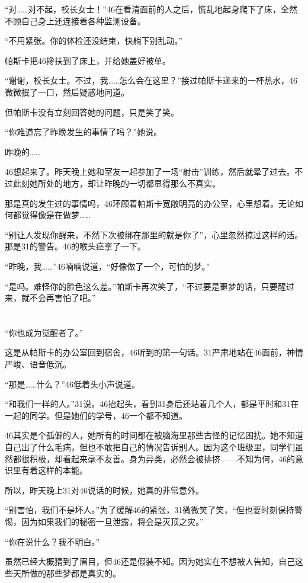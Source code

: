 “对……对不起，校长女士！”46在看清面前的人之后，慌乱地起身爬下了床，全然不顾自己身上还连接着各种监测设备。

“不用紧张。你的体检还没结束，快躺下别乱动。”

帕斯卡把46搀扶到了床上，并给她盖好被单。

“谢谢，校长女士。不过，我……怎么会在这里？”接过帕斯卡递来的一杯热水，46微微抿了一口，然后疑惑地问道。

但帕斯卡没有立刻回答她的问题，只是笑了笑。

“你难道忘了昨晚发生的事情了吗？”她说。

昨晚的……

46想起来了。昨天晚上她和室友一起参加了一场“射击”训练，然后就晕了过去。不过此刻她所处的地方，却让昨晚的一切都显得那么不真实。

那是真的发生过的事情吗，46环顾着帕斯卡宽敞明亮的办公室，心里想着。无论如何都觉得像是在做梦……

“别让人发现你醒来，不然下次被绑在那里的就是你了”，心里忽然掠过这样的话。那是31的警告。46的喉头痉挛了一下。

“昨晚，我……”46喃喃说道，“好像做了一个，可怕的梦。”

“是吗。难怪你的脸色这么差。”帕斯卡再次笑了，“不过要是噩梦的话，只要醒过来，就不会再害怕了吧。”

\section*{}

“你也成为觉醒者了。”

这是从帕斯卡的办公室回到宿舍，46听到的第一句话。31严肃地站在46面前，神情严峻、语音低沉。

“那是……什么？”46低着头小声说道。

“和我们一样的人。”31说。46抬起头，看到31身后还站着几个人，都是平时和31在一起的同学。但是她们的学号，46一个都不知道。

46其实是个孤僻的人，她所有的时间都在被脑海里那些古怪的记忆困扰。她不知道自己出了什么毛病，但也不敢把自己的情况告诉别人。因为这个班级里，同学们虽然都很积极，却看起来毫不友善。身为异类，必然会被排挤——不知为何，46的意识里有着这样的本能。

所以，昨天晚上31对46说话的时候，她真的非常意外。

“别害怕，我们不是坏人。”为了缓解46的紧张，31微微笑了笑，“但也要时刻保持警惕，因为如果我们的秘密一旦泄露，将会是灭顶之灾。”

“你在说什么？我不明白。”

虽然已经大概猜到了眉目，但46还是假装不知。因为她实在不想被人告知，自己这些天所做的那些梦都是真实的。

